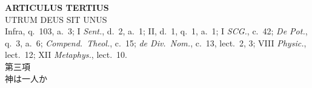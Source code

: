 \documentclass[paper=a4paper,fontsize=10pt,jafontsize=9pt,titlepage]{jlreq}
\begin{document}
\newpage
{}

\begin{center}
 {\Large {\bfseries ARTICULUS TERTIUS}}\\
 {\large UTRUM DEUS SIT UNUS}\\
 {\footnotesize Infra, q.~103, a.~3; I {\itshape Sent.}, d.~2, a.~1; II,
 d.~1, q.~1, a.~1; I {\itshape SCG.}, c.~42; {\itshape De Pot.}, q.~3,
 a.~6; {\itshape Compend.~Theol.}, c.~15; {\itshape de Div.~Nom.},
 c.~13, lect.~2, 3; VIII {\itshape Physic.}, lect.~12; XII {\itshape
 Metaphys.}, lect.~10.}\\
 {\Large 第三項\\神は一人か}
\end{center}



{}
\setcounter{section}{3}
\setcounter{subsection}{0}
\end{document}
